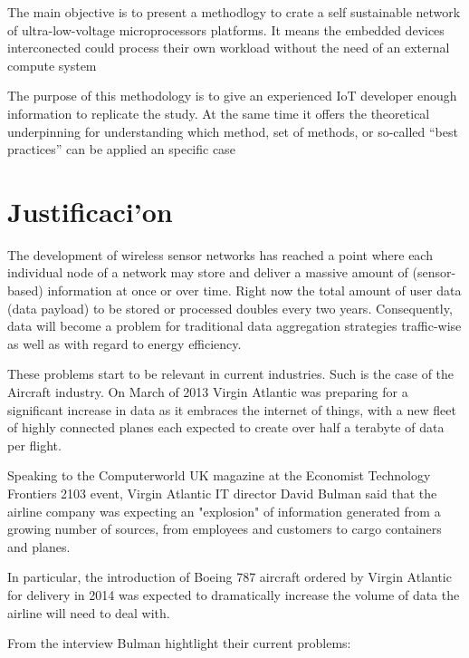 The main objective is to present a methodlogy to crate a self sustainable
network of ultra-low-voltage microprocessors platforms. It means the embedded 
devices interconected could process their own workload without the need of an 
external compute system

The purpose of this methodology is to give an experienced IoT  developer 
enough information to replicate the study. At the same time it offers the theoretical 
underpinning for understanding which method, set of methods, or so-called “best 
practices” can be applied an specific case


\section{Justificaci'on}
\noindent

The development of wireless sensor networks has reached a point where each 
individual node of a network may store and deliver a massive amount of 
(sensor-based) information at once or over time. Right now the total amount of 
user data (data payload) to be stored or processed doubles every two years. Consequently,
data will become a problem for traditional data aggregation strategies 
traffic-wise as well as with regard to energy efficiency. 

These problems start to be relevant in current industries. Such is the case of 
the Aircraft industry. On March of 2013 Virgin Atlantic was preparing for a 
significant increase in data as it embraces the internet of things, with a new fleet of highly 
connected planes each expected to create over half a terabyte of data per flight.

Speaking to the Computerworld UK magazine at the Economist Technology Frontiers 2103 event, Virgin 
Atlantic IT director David Bulman said that the airline company was expecting an 
"explosion" of information generated from a growing number of sources, from 
employees and customers to cargo containers and planes.

In particular, the introduction of Boeing 787 aircraft ordered by Virgin 
Atlantic for delivery in 2014  was expected to dramatically increase the volume 
of data the airline will need to deal with.

From the interview Bulman hightlight their current problems: 


